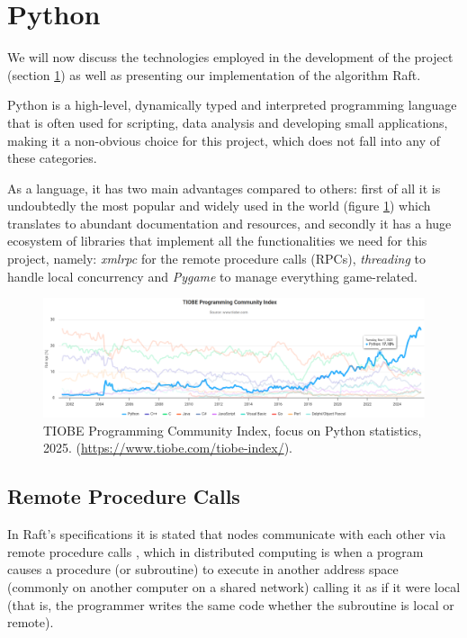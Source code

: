 \section{Python} \label{sec:python}

We will now discuss the technologies employed in the development of the project (section \ref{sec:python}) as well as presenting our implementation of the algorithm Raft.

Python is a high-level, dynamically typed and interpreted programming language that is often used for scripting, data analysis and developing small applications, making it a non-obvious choice for this project, which does not fall into any of these categories.

As a language, it has two main advantages compared to others: first of all it is undoubtedly the most popular and widely used in the world (figure \ref{fig:tiobe}) \cite{tiobe,ieeeSpect} which translates to abundant documentation and resources, and secondly it has a huge ecosystem of libraries that implement all the functionalities we need for this project, namely: \textit{xmlrpc} for the remote procedure calls (RPCs), \textit{threading} to handle local concurrency and \textit{Pygame} to manage everything game-related.

\begin{figure}[h]
  \centering
  \includegraphics[width=\linewidth]{images/TIOBEindex.png}
  \caption{TIOBE Programming Community Index, focus on Python statistics, 2025. (\url{https://www.tiobe.com/tiobe-index/}).}
  \label{fig:tiobe}
\end{figure}


\subsection{Remote Procedure Calls} \label{sec:xmlrpc}

In Raft's specifications it is stated that nodes communicate with each other via remote procedure calls \cite{raft}, which in distributed computing is when a program causes a procedure (or subroutine) to execute in another address space (commonly on another computer on a shared network) calling it as if it were local (that is, the programmer writes the same code whether the subroutine is local or remote).

